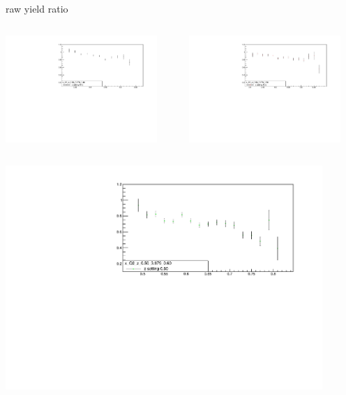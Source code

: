 \begin{frame}{raw yield ratio}
\begin{columns}
\begin{column}[T]{0.5\textwidth}
\includegraphics[width = 0.9\textwidth]{results/yield/statistics/x_Q2_z_0.50_3.979_0.40_ratio.pdf}
\end{column}
\begin{column}[T]{0.5\textwidth}
\includegraphics[width = 0.9\textwidth]{results/yield/statistics/x_Q2_z_0.50_3.979_0.50_ratio.pdf}
\end{column}
\end{columns}
\begin{columns}
\begin{column}[T]{0.5\textwidth}
\includegraphics[width = 0.9\textwidth]{results/yield/statistics/x_Q2_z_0.50_3.979_0.60_ratio.pdf}

\end{column}
\end{columns}
\end{frame}
